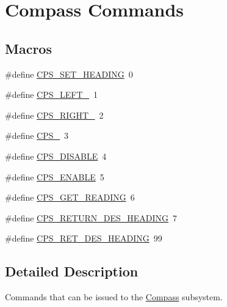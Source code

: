 \hypertarget{group__compass__commands}{\section{Compass Commands}
\label{group__compass__commands}
}
\subsection*{Macros}
\begin{DoxyCompactItemize}
\item 
\#define \hyperlink{group__compass__commands_ga10dbf50964cb04b6648e3b65502c0ff4}{C\-P\-S\-\_\-\-S\-E\-T\-\_\-\-H\-E\-A\-D\-I\-N\-G}~0
\item 
\#define \hyperlink{group__compass__commands_gab51c4d4e21701c7cd0230a24c2ab74be}{C\-P\-S\-\_\-\-L\-E\-F\-T\-\_}~1
\item 
\#define \hyperlink{group__compass__commands_ga53ccdcb9ce75af6b95e56476367d2875}{C\-P\-S\-\_\-\-R\-I\-G\-H\-T\-\_}~2
\item 
\#define \hyperlink{group__compass__commands_gafb06fe5e8531750fd730129beb1c85a9}{C\-P\-S\-\_}~3
\item 
\#define \hyperlink{group__compass__commands_gacc391ac5638a636771f016cfa1991d4d}{C\-P\-S\-\_\-\-D\-I\-S\-A\-B\-L\-E}~4
\item 
\#define \hyperlink{group__compass__commands_ga7991975b6f6c2c5c731bafe810ebcab8}{C\-P\-S\-\_\-\-E\-N\-A\-B\-L\-E}~5
\item 
\#define \hyperlink{group__compass__commands_ga5804a250179671cacf4c9b1b4572d8de}{C\-P\-S\-\_\-\-G\-E\-T\-\_\-\-R\-E\-A\-D\-I\-N\-G}~6
\item 
\#define \hyperlink{group__compass__commands_gaa446e15281de94b24f27a8464025c20d}{C\-P\-S\-\_\-\-R\-E\-T\-U\-R\-N\-\_\-\-D\-E\-S\-\_\-\-H\-E\-A\-D\-I\-N\-G}~7
\item 
\#define \hyperlink{group__compass__commands_gaa0a242da0fef5b0cb4d25feda73338b7}{C\-P\-S\-\_\-\-R\-E\-T\-\_\-\-D\-E\-S\-\_\-\-H\-E\-A\-D\-I\-N\-G}~99
\end{DoxyCompactItemize}


\subsection{Detailed Description}
Commands that can be issued to the \hyperlink{classCompass}{Compass} subsystem. 

